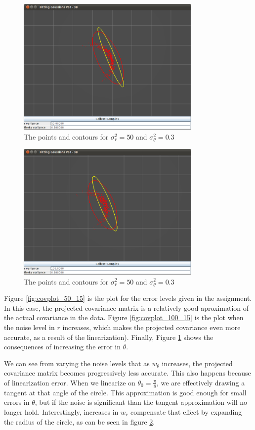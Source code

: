 \documentclass[12pt]{article}
\begin{document}
\begin{figure}
\centering
\includegraphics[width=0.8\textwidth]{figures/GaussianFit_50_0_3.png}
\caption{The points and contours for $\sigma^2_r=50$ and $\sigma^2_\theta=0.3$}
\label{fig:covplot_50_30}
\end{figure}

\begin{figure}
\centering
\includegraphics[width=0.8\textwidth]{figures/GaussianFit_100_0_3.png}
\caption{The points and contours for $\sigma^2_r=50$ and $\sigma^2_\theta=0.3$}
\label{fig:covplot_100_30}
\end{figure}

Figure \ref{fig:covplot_50_15} is the plot for the error levels given in the assignment. In this case, the projected covariance matrix is a relatively good aproximation of the actual covariance in the data. Figure \ref{fig:covplot_100_15} is the plot when the noise level in $r$ increases, which makes the projected covariance even more accurate, as a result of the linearization). Finally, Figure \ref{fig:covplot_50_30} shows the consequences of increasing the error in $\theta$.

We can see from varying the noise levels that as $w_\theta$ increases, the projected covariance matrix becomes progressively less accurate. This also happens because of linearization error. When we linearize on $\theta_0=\frac{\pi}{8}$, we are effectively drawing a tangent at that angle of the circle. This approximation is good enough for small errors in $\theta$, but if the noise is significant than the tangent approximation will no longer hold. Interestingly, increases in $w_r$ compensate that effect by expanding the radius of the circle, as can be seen in figure \ref{fig:covplot_100_30}.

\end{document}
